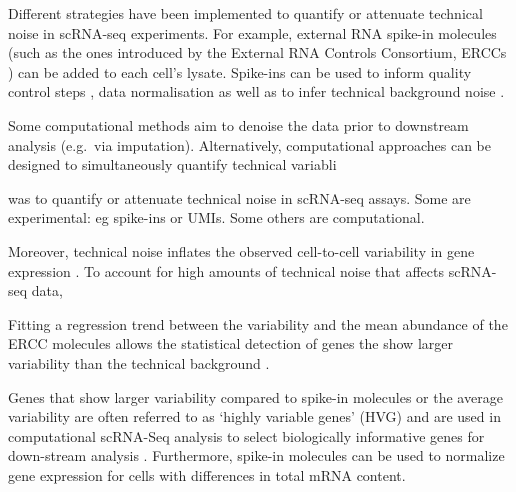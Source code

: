 \documentclass[9pt,a4paper,]{extarticle}
\begin{document}
Different strategies have been implemented to quantify or attenuate technical
noise in scRNA-seq experiments. For example, external RNA spike-in molecules
(such as the ones introduced by the External RNA Controls Consortium, ERCCs
\citep{Rna2005}) can be added to each cell's lysate. Spike-ins can be used to inform
quality control steps \citep{McCarthy2017}, data normalisation \citep{Vallejos2017} as
well as to infer technical background noise \citep{Brennecke2013}.

Some computational methods aim to denoise the data prior to downstream analysis
(e.g.~via imputation). Alternatively, computational approaches can be designed
to simultaneously quantify technical variabli

was to quantify or attenuate technical noise in scRNA-seq assays.
Some are experimental: eg spike-ins or UMIs. Some others are computational.

Moreover, technical noise inflates the observed cell-to-cell variability in gene
expression \citep{Brennecke2013}.
To account for high amounts of technical noise that affects scRNA-seq data,

Fitting a regression trend between the variability and the mean abundance of the
ERCC molecules allows the statistical detection of genes the show larger
variability than the technical background .

Genes that show larger variability compared to spike-in molecules or the average
variability are often referred to as `highly variable genes' (HVG) and are used in
computational scRNA-Seq analysis to select biologically informative genes for
down-stream analysis \citep{Lun2016}.
Furthermore, spike-in molecules can be used to normalize gene expression for
cells with differences in total mRNA content.

{\small}
\end{document}
